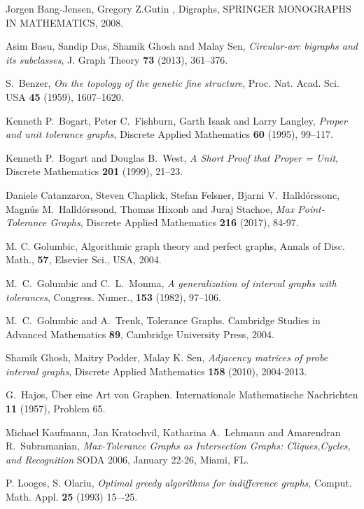 \documentclass{article}
\theoremstyle{definition}
\numberwithin{equation}{section}
\begin{document}
{\small \begin{thebibliography}{99}


Jorgen Bang-Jensen, Gregory Z.Gutin , Digraphs, SPRINGER MONOGRAPHS IN MATHEMATICS, 2008.

Asim Basu, Sandip Das, Shamik Ghosh and Malay Sen, \emph{Circular-arc bigraphs and its subclasses}, J. Graph Theory \textbf{73} (2013), 361--376.

S.~Benzer, \emph{On the topology of the genetic fine structure}, Proc. Nat. Acad. Sci. USA \textbf{45} (1959), 1607--1620.


Kenneth P.~Bogart, Peter C.~Fishburn, Garth Isaak and Larry Langley, \emph{Proper and unit tolerance graphs}, Discrete Applied Mathematics \textbf{60} (1995), 99--117.

Kenneth P.~Bogart and Douglas B.~West, \emph{A Short Proof that Proper = Unit}, Discrete Mathematics \textbf{201} (1999), 21--23.


Daniele Catanzaroa, Steven Chaplick, Stefan Felsner, Bjarni V.~Halldórssonc, Magnús M.~Halldórssond, Thomas Hixonb and Juraj Stachoe, \emph{Max Point-Tolerance Graphs}, Discrete Applied Mathematics \textbf{216} (2017), 84-97.


M. C. Golumbic, Algorithmic graph theory and perfect graphs, Annals of Disc. Math., \textbf{57}, Elsevier Sci., USA, 2004.

M.~C.~Golumbic and C.~L.~Monma, \emph{A generalization of interval graphs with tolerances}, Congress. Numer., \textbf{153} (1982), 97--106.

M.~C.~Golumbic and A.~Trenk, Tolerance Graphs. Cambridge Studies in Advanced Mathematics \textbf{89}, Cambridge University Press, 2004.

Shamik Ghosh, Maitry Podder, Malay K. Sen, \emph{Adjacency matrices of probe interval graphs}, Discrete Applied Mathematics \textbf{158} (2010), 2004-2013.


G.~Haj$\ddot{o}$s, Über eine Art von Graphen. Internationale Mathematische Nachrichten \textbf{11} (1957), Problem 65.

Michael Kaufmann, Jan Kratochvil, Katharina A.~Lehmann and Amarendran R.~Subramanian, \emph{Max-Tolerance Graphs as Intersection Graphs: Cliques,Cycles, and Recognition} SODA 2006, January 22-26, Miami, FL. 


 P. Looges, S. Olariu, \emph{Optimal greedy algorithms for indifference graphs}, Comput. Math. Appl. \textbf{25} (1993) 15–-25.


\end{thebibliography}}
\end{document}

